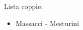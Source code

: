 \documentclass[preview]{standalone}
\begin{document}
Lista coppie:
\begin{itemize}
\item Massacci - Mesturini
\end{itemize}
\end{document}

